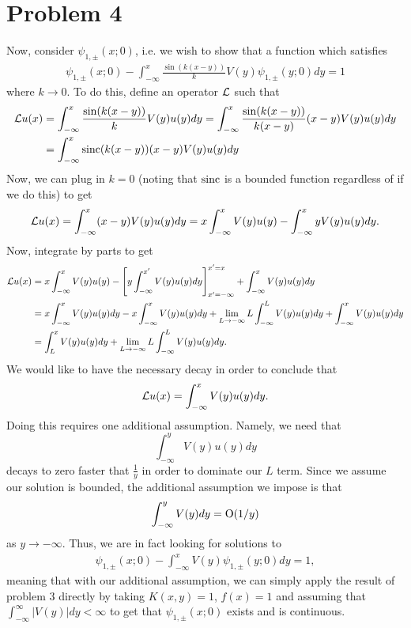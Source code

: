 \documentclass{article}
\begin{document}
\section{Problem 4}
Now, consider $\psi_{1,\pm}(x;0)$, i.e. we wish to show that a function which satisfies
\begin{align*}
    \psi_{1,\pm}(x;0) - \int_{-\infty}^x \frac{\sin(k (x-y))}{k} V(y) \psi_{1,\pm}(y;0) d y = 1
  \end{align*}
where $k\to0$. To do this, define an operator ${\cal L}$ such that
\begin{align*}
{\cal L} u(x)&=\int_{-\infty}^x \frac{\sin(k (x-y))}{k} V(y) u(y) d y=\int_{-\infty}^x \frac{\sin(k (x-y))}{k(x-y)}(x-y) V(y) u(y) d y\\&=
\int_{-\infty}^x \operatorname{sinc}(k(x-y))(x-y) V(y) u(y) d y
\end{align*}
Now, we can plug in $k=0$ (noting that $\operatorname{sinc}$ is a bounded function regardless of if we do this) to get 
\begin{align*}
{\cal L} u(x)=\int_{-\infty}^x (x-y) V(y) u(y) d y= x\int_{-\infty}^xV(y)u(y)-\int_{-\infty}^x y V(y) u(y) d y.
\end{align*}
Now, integrate by parts to get
\begin{align*}
{\cal L} u(x)&=x\int_{-\infty}^xV(y)u(y)-\left[y\int_{-\infty}^{x'} V(y) u(y) d y\right]_{x'=-\infty}^{x'=x}+\int_{-\infty}^x V(y) u(y) d y\\&=x\int_{-\infty}^xV(y)u(y)dy-x\int_{-\infty}^xV(y)u(y)dy+\lim_{L\to-\infty}L\int_{-\infty}^LV(y)u(y)dy+\int_{-\infty}^x V(y) u(y) d y\\&=
\int_{L}^x V(y) u(y) d y+\lim_{L\to-\infty}L\int_{-\infty}^LV(y)u(y)dy.
\end{align*}
We would like to have the necessary decay in order to conclude that 
\[
{\cal L} u(x)=\int_{-\infty}^x V(y) u(y) d y.
\]
Doing this requires one additional assumption. Namely, we need that 
\[
\int_{-\infty}^y V(y)u(y)dy
\]
decays to zero faster that $\frac{1}{y}$ in order to dominate our $L$ term. Since we assume our solution is bounded, the additional assumption we impose is that
\[
\int_{-\infty}^y V(y)dy=\operatorname{O}(1/y)
\]
as $y\to-\infty$. Thus, we are in fact looking for solutions to
\begin{align*}
    \psi_{1,\pm}(x;0) - \int_{-\infty}^x V(y) \psi_{1,\pm}(y;0) d y = 1,
  \end{align*}
meaning that with our additional assumption, we can simply apply the result of problem 3 directly by taking $K(x,y)=1$, $f(x)=1$ and assuming that $\int_{-\infty}^\infty|V(y)| d y < \infty$ to get that $\psi_{1,\pm}(x;0)$ exists and is continuous. 
\end{document}
